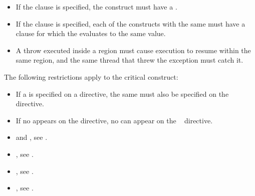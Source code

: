 
\restrictions
\begin{itemize}
\item If the  clause is specified, the  
      construct must have a .
\item If the  clause is specified, each of the
   constructs with the same  must have a
   clause for which the  evaluates to the same
  value.

\end{itemize}

\begin{cppspecific}
\begin{itemize}
\item A throw executed inside a  region must cause execution to resume within 
the same  region, and the same thread that threw the exception must catch 
it.
\end{itemize}
\end{cppspecific}

\begin{fortranspecific}
The following restrictions apply to the critical construct:

\begin{itemize}
\item If a  is specified on a  directive, the same  must also be 
specified on the ~ directive. 

\item If no  appears on the  directive, no  can appear on the 
~ directive.
\end{itemize}
\end{fortranspecific}

\crossreferences
\begin{itemize}
\item {} and , see 
.

\item {}, see
.

\item {}, see
.

\item {}, see
.

\end{itemize}









